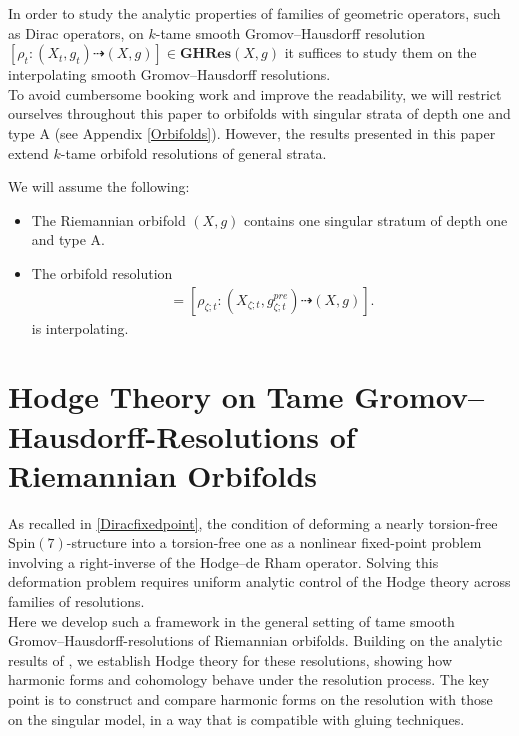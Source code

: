 \documentclass[psamsfonts]{amsart}
\theoremstyle{plain}
\theoremstyle{definition}{
\newtheorem{defi}{Definition}[section]
\newtheorem{ass}{Assumption}
\newtheorem*{nota}{Notation}}
\theoremstyle{remark}{
\newtheorem{rem}{Remark}
\newtheorem{ex}{Example}}
\theoremstyle{plain}{
\newtheorem{thm}{Theorem}[section]
\newtheorem{lem}{Lemma}[section]
\newtheorem{cor}{Corollary}[section]
\newtheorem{prop}{Proposition}[section]
\newtheorem{con}{Conjecture}[section]}
\newenvironment{manualassumption}[1]{%
  \renewcommand\themanualassumptioninner{#1}%
  \manualassumptioninner
}{\endmanualassumptioninner}
\newcommand{\m}[1]{{\mathrm{#1}}}
\newcommand{\cat}[1]{\textbf{#1}}
\begin{document}
In order to study the analytic properties of families of geometric operators, such as Dirac operators, on $k$-tame smooth Gromov--Hausdorff resolution $[\rho_t\colon(X_t,g_{t})\dashrightarrow (X,g)]\in \cat{GHRes}(X,g)$ it suffices to study them on the interpolating smooth Gromov--Hausdorff resolutions.\\

To avoid cumbersome booking work and improve the readability, we will restrict ourselves throughout this paper to orbifolds with singular strata of depth one and type A (see Appendix \ref{Orbifolds}). However, the results presented in this paper extend $k$-tame orbifold resolutions of general strata.


\begin{manualassumption}{1}
\label{ass1}    
We will assume the following: 
\begin{itemize}
    \item The Riemannian orbifold $(X,g)$ contains one singular stratum of depth one and type A.
    \item 
The orbifold resolution 
\begin{align*}
[\rho_t\colon(X_t,g_{t})\dashrightarrow (X,g)]=[\rho_{\zeta;t}\colon(X_{\zeta;t},g^{pre}_{\zeta;t})\dashrightarrow (X,g)].
\end{align*}
is interpolating.
\end{itemize}
\end{manualassumption}



\section{Hodge Theory on Tame Gromov--Hausdorff-Resolutions of Riemannian Orbifolds}
\label{Hodge Theory on Tame Gromov--Hausdorff-Resolutions of Riemannian Orbifolds}

As recalled in \eqref{Diracfixedpoint}, the condition of deforming a nearly torsion-free $\m{Spin}(7)$-structure into a torsion-free one as a nonlinear fixed-point problem involving a right-inverse of the Hodge–de Rham operator. Solving this deformation problem requires uniform analytic control of the Hodge theory across families of resolutions.\\

Here we develop such a framework in the general setting of tame smooth Gromov–Hausdorff-resolutions of Riemannian orbifolds. Building on the analytic results of \cite{majewskiDirac}, we establish Hodge theory for these resolutions, showing how harmonic forms and cohomology behave under the resolution process. The key point is to construct and compare harmonic forms on the resolution with those on the singular model, in a way that is compatible with gluing techniques.\\
\end{document}
